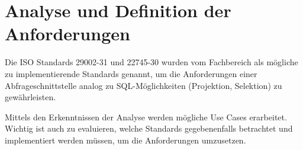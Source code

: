 \chapter{Analyse und Definition der Anforderungen } \label{kap:analyse_und_definition}

Die ISO Standards 29002-31 und 22745-30 wurden vom Fachbereich als mögliche zu implementierende Standards genannt, um die Anforderungen einer Abfrageschnittstelle analog zu SQL-Möglichkeiten (Projektion, Selektion) zu gewährleisten.   

Mittels den Erkenntnissen der Analyse werden mögliche Use Cases erarbeitet. Wichtig ist auch zu evaluieren, welche Standards gegebenenfalls betrachtet und implementiert werden müssen, um die Anforderungen umzusetzen. 




